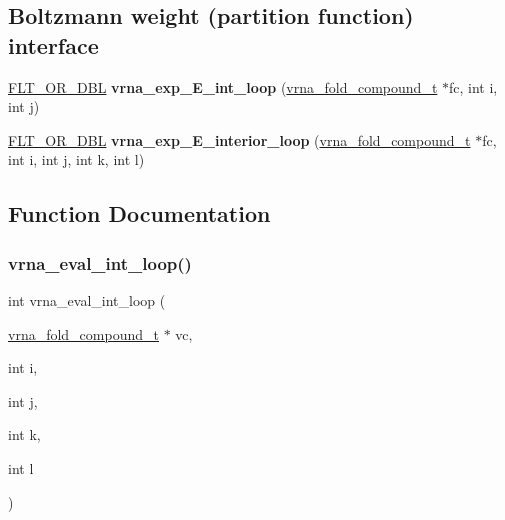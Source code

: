 \subsection*{Boltzmann weight (partition function) interface}
\begin{DoxyCompactItemize}
\item 
\mbox{\label{group__eval__loops__int_gaa64bb3e28f557985a4d448f8fd86a115}} 
\hyperlink{group__data__structures_ga31125aeace516926bf7f251f759b6126}{F\+L\+T\+\_\+\+O\+R\+\_\+\+D\+BL} {\bfseries vrna\+\_\+exp\+\_\+\+E\+\_\+int\+\_\+loop} (\hyperlink{group__fold__compound_ga1b0cef17fd40466cef5968eaeeff6166}{vrna\+\_\+fold\+\_\+compound\+\_\+t} $\ast$fc, int i, int j)
\item 
\mbox{\label{group__eval__loops__int_ga51130eaa2debd3bb8e52de7a3de048ad}} 
\hyperlink{group__data__structures_ga31125aeace516926bf7f251f759b6126}{F\+L\+T\+\_\+\+O\+R\+\_\+\+D\+BL} {\bfseries vrna\+\_\+exp\+\_\+\+E\+\_\+interior\+\_\+loop} (\hyperlink{group__fold__compound_ga1b0cef17fd40466cef5968eaeeff6166}{vrna\+\_\+fold\+\_\+compound\+\_\+t} $\ast$fc, int i, int j, int k, int l)
\end{DoxyCompactItemize}


\subsection{Function Documentation}
\mbox{\label{group__eval__loops__int_gaab3547bfcdc39d89babbc7ed2a1a4b65}} 
\subsubsection{\texorpdfstring{vrna\+\_\+eval\+\_\+int\+\_\+loop()}{vrna\_eval\_int\_loop()}}
{\footnotesize\ttfamily int vrna\+\_\+eval\+\_\+int\+\_\+loop (\begin{DoxyParamCaption}\item[{\hyperlink{group__fold__compound_ga1b0cef17fd40466cef5968eaeeff6166}{vrna\+\_\+fold\+\_\+compound\+\_\+t} $\ast$}]{vc,  }\item[{int}]{i,  }\item[{int}]{j,  }\item[{int}]{k,  }\item[{int}]{l }\end{DoxyParamCaption})}



